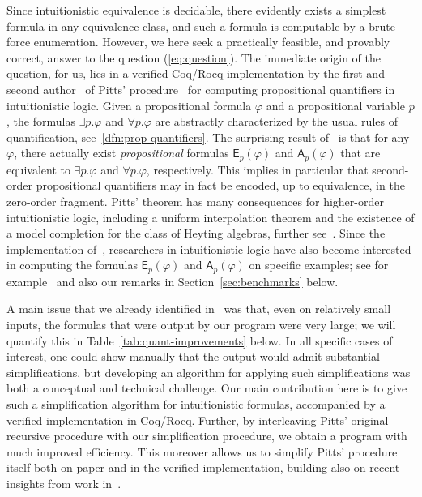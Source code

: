 \documentclass[english,final]{jflart}
\newcommand{\Coq}{{Coq/Rocq}}
\theoremstyle{definition}
\theoremstyle{plain}
\newcommand{\Ap}[1]{\mathsf{A}_{p}(#1)}
\newcommand{\Ep}[1]{\mathsf{E}_{p}(#1)}
\renewcommand{\phi}{\varphi}
\begin{document}
Since intuitionistic equivalence is decidable, there evidently exists a simplest formula in any equivalence class, and such a formula is computable by a brute-force enumeration. However, we here seek a practically feasible, and provably correct, answer to the question (\ref{eq:question}).
The immediate origin of the question, for us, lies in a verified {\Coq} implementation by the first and second author~\cite{FerGoo2023} of Pitts' procedure~\cite{Pit1992} for computing propositional quantifiers in intuitionistic logic. Given a propositional formula $\phi$ and a propositional variable $p$, the formulas $\exists p. \phi$ and $\forall p. \phi$ are abstractly characterized by the usual rules of quantification, see~\cref{dfn:prop-quantifiers}. The surprising result of~\cite{Pit1992} is that for any $\phi$, there actually exist \emph{propositional} formulas $\Ep{\phi}$ and $\Ap{\phi}$ that are equivalent to $\exists p. \phi$ and $\forall p. \phi$, respectively. This implies in particular that second-order propositional quantifiers may in fact be encoded, up to equivalence, in the zero-order fragment. Pitts' theorem has many consequences for higher-order intuitionistic logic, including a uniform interpolation theorem and the existence of a model completion for the class of Heyting algebras, further see~\cite{GhiZaw2002}. Since the implementation of~\cite{FerGoo2023}, researchers in intuitionistic logic have also become interested in computing the formulas $\Ep{\phi}$ and $\Ap{\phi}$ on specific examples; see for example~\cite{Koc2023} and also our remarks in Section~\ref{sec:benchmarks} below.

A main issue that we already identified in~\cite{FerGoo2023} was that, even on relatively small inputs, the formulas that were output by our program were very large; we will quantify this in Table~\ref{tab:quant-improvements} below. In all specific cases of interest, one could show manually that the output would admit substantial simplifications, but developing an algorithm for applying such simplifications was both a conceptual and technical challenge. Our main contribution here is to give such a simplification algorithm for intuitionistic formulas, accompanied by a verified implementation in {\Coq}. Further, by interleaving Pitts' original recursive procedure with our simplification procedure, we obtain a program with much improved efficiency. This moreover allows us to simplify Pitts' procedure itself both on paper and in the verified implementation, building also on recent insights from work in~\cite{FGGS2024}. 
\end{document}
